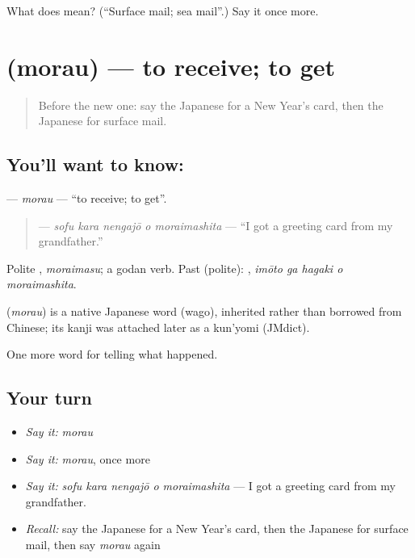 \begin{tcolorbox}[breakable,colback=teal!4,colframe=teal!35!black,title={Before you move on}]
What does  mean? (\textquotedblleft{}Surface mail; sea mail\textquotedblright{}.) Say it once more.
\end{tcolorbox}
\section[\texorpdfstring{\ja{もらう} (morau)}{もらう (morau)}]{ (morau) — to receive; to get}

\label{lesson:JA-C306-morau}



\begin{quote}
Before the new one: say the Japanese for a New Year's card, then the Japanese for surface mail.
\end{quote}

\subsection*{You'll want to know: }
\textbf{} — \emph{morau} — \textquotedblleft{}to receive; to get\textquotedblright{}.

\begin{quote}
\textbf{  } — \emph{sofu kara nengajō o moraimashita} — \textquotedblleft{}I got a greeting card from my grandfather.\textquotedblright{}
\end{quote}

Polite \textbf{}, \emph{moraimasu}; a godan verb. Past (polite): \textbf{  }, \emph{imōto ga hagaki o moraimashita}.

\begin{cousinweb}
\textbf{} (\emph{morau}) is a native Japanese word (wago), inherited rather than borrowed from Chinese; its kanji was attached later as a kun'yomi (JMdict).
\end{cousinweb}

\begin{grammarlens}[title={What you've built}]
One more word for telling what happened.
\end{grammarlens}

\subsection*{Your turn}
\begin{itemize}
\raggedright
  \item \emph{Say it:} \emph{morau}
  \item \emph{Say it:} \emph{morau}, once more
  \item \emph{Say it:} \emph{sofu kara nengajō o moraimashita} — I got a greeting card from my grandfather.
  \item \emph{Recall:} say the Japanese for a New Year's card, then the Japanese for surface mail, then say \emph{morau} again
\end{itemize}

